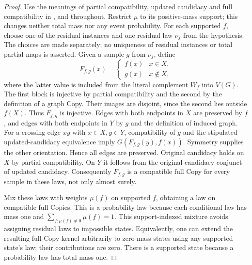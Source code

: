 \begin{proof}
Use the meanings of partial compatibility, updated candidacy and full
compatibility in ,
 and  throughout.
Restrict $\mu$ to its positive-mass support; this changes neither total mass
nor any event probability. For each supported $f$, choose one of the residual
instances and one residual law $\nu_f$ from the hypothesis. The choices are
made separately; no uniqueness of residual instances or total partial maps
is asserted. Given a sample $g$ from $\nu_f$, define
\[
 F_{f,g}(x)=\begin{cases}f(x)&x\in X,\\g(x)&x\notin X,\end{cases}
\]
where the latter value is included from the literal complement $W_f$ into
$V(G)$. The first block is injective by partial compatibility and the second
by the definition of a graph Copy. Their images are disjoint, since the
second lies outside $f(X)$. Thus $F_{f,g}$ is injective.
Edges with both endpoints in $X$ are preserved by $f$, and edges with both
endpoints in $Y$ by $g$ and the definition of induced graph. For a crossing
edge $xy$ with $x\in X,y\in Y$, compatibility of $g$ and the stipulated
updated-candidacy equivalence imply $G(F_{f,g}(y),f(x))$. Symmetry supplies
the other orientation. Hence all edges are preserved. Original candidacy
holds on $X$ by partial compatibility. On $Y$ it follows from the original
candidacy conjunct of updated candidacy. Consequently $F_{f,g}$ is a
compatible full Copy for every sample in these laws, not only almost surely.

Mix these laws with weights $\mu(f)$ on supported $f$, obtaining a law on
compatible full Copies. This is a probability law because each conditional
law has mass one and $\sum_{f:\mu(f)\ne0}\mu(f)=1$. This support-indexed
mixture avoids assigning residual laws to impossible states. Equivalently,
one can extend the resulting full-Copy kernel arbitrarily to zero-mass
states using any supported state's law; their contributions are zero.
There is a supported state because a probability law has total mass one.


\end{proof}
